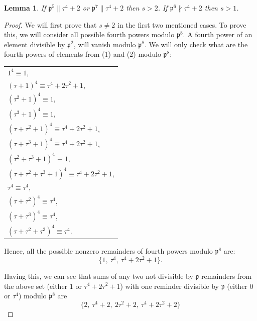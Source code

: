 \documentclass[12pt]{article}
\newtheorem{lemma}[thm]{Lemma}
\theoremstyle{remark}
\begin{document}
\begin{lemma}\label{2.2} If $\mathfrak{p}^{5} \parallel \tau^4+2$ or $\mathfrak{p}^{7} \parallel \tau^4+2$ then $s > 2$. If $\mathfrak{p}^6 \not\parallel \tau^4+2$ then $s > 1$.
\end{lemma}
\begin{proof} We will first prove that $s\neq 2$ in the first two mentioned cases. To prove this, we will consider all possible fourth powers modulo $\mathfrak{p}^{8}$. A fourth power of an element divisible by $\mathfrak{p}^2$, will vanish modulo $\mathfrak{p}^8$. We will only check what are the fourth powers of elements from (1) and (2) modulo $\mathfrak{p}^{8}$:

\begin{center}
\begin{tabular}{@{}l@{}}
    $1^4 \equiv 1$,\\
    $(\tau+1)^4 \equiv  \tau^4 + 2\tau^2 +1$,\\

    $(\tau^2+1)^4 \equiv 1$,\\
 
    $(\tau^3+1)^4 \equiv 1$,\\
       
    $(\tau + \tau^2 + 1)^4 \equiv \tau^4 + 2\tau^2 + 1$,\\
    $(\tau + \tau^3 + 1)^4 \equiv \tau^4 + 2\tau^2 + 1$,\\
    $(\tau^2 + \tau^3 + 1)^4 \equiv 1$,\\
    $(\tau + \tau^2 + \tau^3 + 1)^4 \equiv  \tau^4 + 2\tau^2 + 1$,\\
    
    $\tau^4 \equiv \tau^4$,\\
    $(\tau + \tau^2)^4 \equiv \tau^4$,\\
    $(\tau + \tau^3)^4 \equiv \tau^4$,\\
    $(\tau+\tau^2+\tau^3)^4 \equiv \tau^4$.
\end{tabular}



\end{center}





Hence, all the possible nonzero remainders of fourth powers modulo $\mathfrak{p}^{8}$ are:
\[ \{1, \  \tau^4,\  \tau^4 + 2\tau^2 + 1\}. \]


Having this, we can see that sums of any two not divisible by $\mathfrak{p}$ remainders from the above set (either $1$ or $\tau^4 + 2\tau^2 + 1$) with one reminder divisible by $\mathfrak{p}$ (either 0 or $\tau^4$) modulo $\mathfrak{p}^8$ are 
\[ \{ 2, \ \tau^4+2, \ 2\tau^2 + 2, \ \tau^4 + 2\tau^2+2  \}\]



\end{proof}
\end{document}
